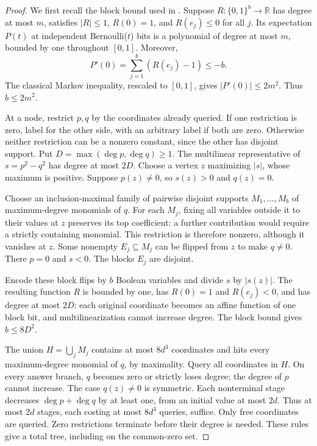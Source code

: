\documentclass[11pt]{article}
\newcommand{\R}{\mathbb R}
\begin{document}
\begin{proof}
We first recall the block bound used in \cite{LLLL,KKDWY}.
Suppose \(R:\{0,1\}^b\to\R\) has degree at most \(m\), satisfies
\(|R|\le1\), \(R(0)=1\), and \(R(e_j)\le0\) for all \(j\).
Its expectation \(P(t)\) at independent Bernoulli(\(t\)) bits is a
polynomial of degree at most \(m\), bounded by one throughout \([0,1]\).
Moreover,
\[
 P'(0)=\sum_{j=1}^b(R(e_j)-1)\le-b.
\]
The classical Markov inequality, rescaled to \([0,1]\), gives
\(|P'(0)|\le2m^2\). Thus \(b\le2m^2\).

At a node, restrict \(p,q\) by the coordinates already queried.
If one restriction is zero, label for the other side, with an arbitrary
label if both are zero. Otherwise neither restriction can be a nonzero
constant, since the other has disjoint support.
Put \(D=\max(\deg p,\deg q)\ge1\). The multilinear representative of
\(s=p^2-q^2\) has degree at most \(2D\).
Choose a vertex \(z\) maximizing \(|s|\), whose maximum is positive.
Suppose \(p(z)\ne0\), so \(s(z)>0\) and \(q(z)=0\).

Choose an inclusion-maximal family of pairwise disjoint supports
\(M_1,\ldots,M_b\) of maximum-degree monomials of \(q\).
For each \(M_j\), fixing all variables outside it to their values at \(z\)
preserves its top coefficient: a further contribution would require a
strictly containing monomial. This restriction is therefore nonzero,
although it vanishes at \(z\). Some nonempty \(E_j\subseteq M_j\)
can be flipped from \(z\) to make \(q\ne0\).
There \(p=0\) and \(s<0\). The blocks \(E_j\) are disjoint.

Encode these block flips by \(b\) Boolean variables and divide \(s\)
by \(|s(z)|\). The resulting function \(R\) is bounded by one, has
\(R(0)=1\) and \(R(e_j)<0\), and has degree at most \(2D\):
each original coordinate becomes an affine function of one block bit,
and multilinearization cannot increase degree.
The block bound gives \(b\le8D^2\).

The union \(H=\bigcup_jM_j\) contains at most \(8d^3\) coordinates
and hits every maximum-degree monomial of \(q\), by maximality.
Query all coordinates in \(H\). On every answer branch, \(q\) becomes
zero or strictly loses degree; the degree of \(p\) cannot increase.
The case \(q(z)\ne0\) is symmetric.
Each nonterminal stage decreases \(\deg p+\deg q\) by at least one,
from an initial value at most \(2d\).
Thus at most \(2d\) stages, each costing at most \(8d^3\) queries,
suffice. Only free coordinates are queried.
Zero restrictions terminate before their degree is needed.
These rules give a total tree, including on the common-zero set.
\end{proof}
\end{document}
